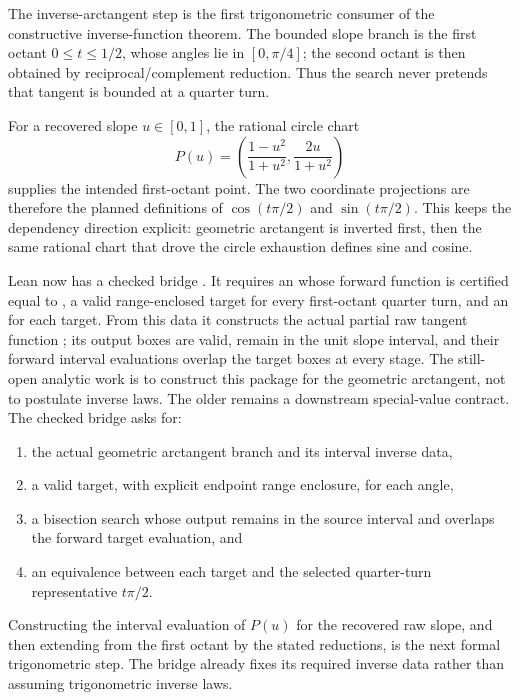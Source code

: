 \begin{definition}
\label{def:inverse-arctan-interface}
{\scriptsize
\par\noindent
{}\par
{}\par
{}
}
The inverse-arctangent step is the first trigonometric consumer of the
constructive inverse-function theorem.  The bounded slope branch is the first
octant \(0\le t\le1/2\), whose angles lie in \([0,\pi/4]\); the second octant
is then obtained by reciprocal/complement reduction.  Thus the search never
pretends that tangent is bounded at a quarter turn.

For a recovered slope \(u\in[0,1]\), the rational circle chart
\[
  P(u)=\left(\frac{1-u^2}{1+u^2},\frac{2u}{1+u^2}\right)
\]
supplies the intended first-octant point.  The two coordinate projections are
therefore the planned definitions of \(\cos(t\pi/2)\) and
\(\sin(t\pi/2)\).  This keeps the dependency direction explicit: geometric
arctangent is inverted first, then the same rational chart that drove the
circle exhaustion defines sine and cosine.

Lean now has a checked bridge .  It requires an
 whose forward function is certified equal
to , a valid range-enclosed target for every first-octant
quarter turn, and an  for each target.  From this
data it constructs the actual partial raw tangent function
; its output boxes are valid, remain in the unit slope
interval, and their forward interval evaluations overlap the target boxes at
every stage.  The still-open analytic work is to construct this package for
the geometric arctangent, not to postulate inverse laws.  The older
 remains a downstream special-value contract.
The checked bridge asks for:
\begin{enumerate}
\item the actual geometric arctangent branch and its interval inverse data,
\item a valid target, with explicit endpoint range enclosure, for each angle,
\item a bisection search whose output remains in the source interval and
  overlaps the forward target evaluation, and
\item an equivalence between each target and the selected quarter-turn
  representative \(t\pi/2\).
\end{enumerate}
Constructing the interval evaluation of \(P(u)\) for the recovered raw slope,
and then extending from the first octant by the stated reductions, is the next
formal trigonometric step.  The bridge already fixes its required inverse data
rather than assuming trigonometric inverse laws.
\end{definition}

